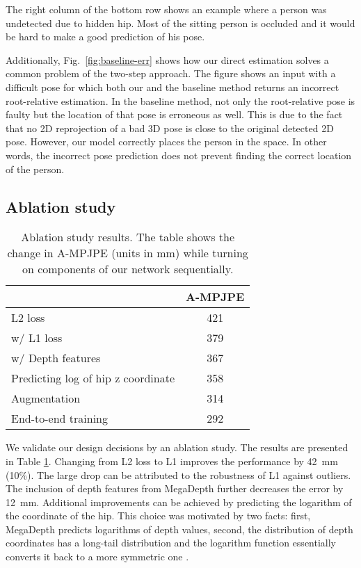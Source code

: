 \documentclass[conference]{IEEEtran}
\begin{document}
The right column of the bottom row shows an example where a person was undetected due to hidden hip. Most of the sitting person is occluded and it would be hard to make a good prediction of his pose.

Additionally, Fig.~\ref{fig:baseline-err} shows how our direct estimation solves a common problem of the two-step approach. The figure shows an input with a difficult pose for which both our and the baseline method returns an incorrect root-relative estimation. In the baseline method, not only the root-relative pose is faulty but the location of that pose is erroneous as well. This is due to the fact that no 2D reprojection of a bad 3D pose is close to the original detected 2D pose. However, our model correctly places the person in the space. In other words, the incorrect pose prediction does not prevent finding the correct location of the person.

\subsection{Ablation study}

\begin{table}[htb]
\caption{Ablation study results. The table shows the change in A-MPJPE (units in mm) while turning on  components of our network sequentially.}
\begin{center}
\begin{tabular}{lc}
 & A-MPJPE \\
\hline
L2 loss  &  421 \\
w/ L1 loss &  379 \\
w/ Depth features & 367 \\
Predicting log of hip z coordinate & 358 \\
Augmentation & 314 \\
End-to-end training & 292 \\
\hline
\end{tabular}
\label{tab:ablation}
\end{center}
\end{table}

We validate our design decisions by an ablation study. The results are presented in Table \ref{tab:ablation}. Changing from L2 loss to L1 improves the performance by 42~mm (10\%). The large drop can be attributed to the robustness of L1 against outliers. The inclusion of depth features from MegaDepth further decreases the error by 12~mm. Additional improvements can be achieved by predicting the logarithm of the  coordinate of the hip. This choice was motivated by two facts: first, MegaDepth predicts logarithms of depth values, second, the distribution of depth coordinates has a long-tail distribution and the logarithm function essentially converts it back to a more symmetric one \cite{megadepth2018}.
\end{document}
